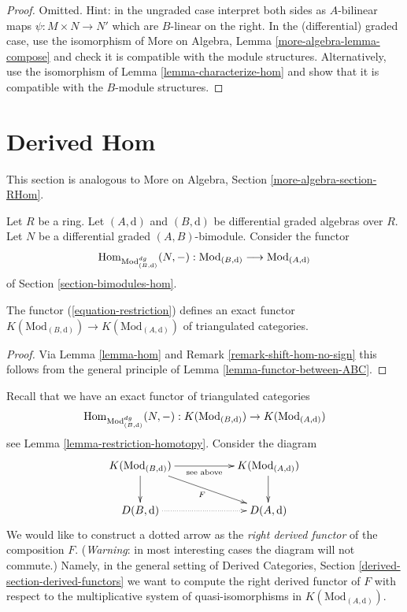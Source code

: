 \begin{proof}
Omitted. Hint: in the ungraded case interpret both sides as $A$-bilinear maps
$\psi : M \times N \to N'$ which are $B$-linear on the right.
In the (differential) graded case, use the isomorphism of
More on Algebra, Lemma \ref{more-algebra-lemma-compose}
and check it is compatible with the module structures.
Alternatively, use the isomorphism of Lemma \ref{lemma-characterize-hom}
and show that it is compatible with the $B$-module structures.
\end{proof}







\section{Derived Hom}
\label{section-restriction}

\noindent
This section is analogous to
More on Algebra, Section \ref{more-algebra-section-RHom}.

\medskip\noindent
Let $R$ be a ring. Let $(A, \text{d})$ and $(B, \text{d})$
be differential graded algebras over $R$. Let $N$ be a
differential graded $(A, B)$-bimodule. Consider the functor
\begin{equation}
\label{equation-restriction}
\mathop{\mathrm{Hom}}\nolimits_{\text{Mod}^{dg}_{(B, \text{d})}}(N, -) :
\text{Mod}_{(B, \text{d})}
\longrightarrow
\text{Mod}_{(A, \text{d})}
\end{equation}
of Section \ref{section-bimodules-hom}.

\begin{lemma}
\label{lemma-restriction-homotopy}
The functor (\ref{equation-restriction}) defines an exact functor
$K(\text{Mod}_{(B, \text{d})}) \to K(\text{Mod}_{(A, \text{d})})$
of triangulated categories.
\end{lemma}

\begin{proof}
Via Lemma \ref{lemma-hom} and
Remark \ref{remark-shift-hom-no-sign}
this follows from the general principle of
Lemma \ref{lemma-functor-between-ABC}.
\end{proof}

\noindent
Recall that we have an exact functor
of triangulated categories
$$
\mathop{\mathrm{Hom}}\nolimits_{\text{Mod}^{dg}_{(B, \text{d})}}(N, -) :
K(\text{Mod}_{(B, \text{d})}) \to K(\text{Mod}_{(A, \text{d})})
$$
see Lemma \ref{lemma-restriction-homotopy}. Consider the diagram
$$
\xymatrix{
K(\text{Mod}_{(B, \text{d})}) \ar[d] \ar[rr]_{\text{see above}} \ar[rrd]_F & &
K(\text{Mod}_{(A, \text{d})}) \ar[d] \\
D(B, \text{d}) \ar@{..>}[rr] & &
D(A, \text{d})
}
$$
We would like to construct a dotted arrow as the
{\it right derived functor} of the composition $F$.
({\it Warning}: in most interesting cases the diagram will not commute.)
Namely, in the general setting of
Derived Categories, Section \ref{derived-section-derived-functors}
we want to compute the
right derived functor of $F$ with respect to the multiplicative system of
quasi-isomorphisms in $K(\text{Mod}_{(A, \text{d})})$.

